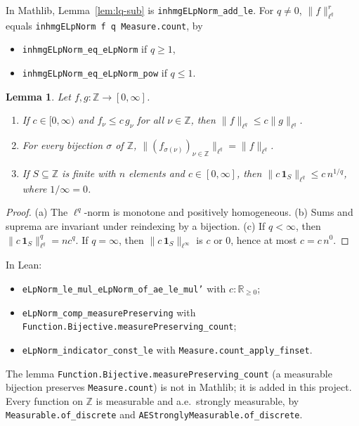 \documentclass[11pt]{article}
\newtheorem{lemma}[theorem]{Lemma}
\theoremstyle{definition}
\theoremstyle{remark}
\newcommand{\norm}[2]{\lVert #1\rVert_{#2}}
\newcommand{\Z}{\mathbb Z}
\newcommand{\one}{\mathbf 1}
\begin{document}
In Mathlib, Lemma~\ref{lem:lq-sub} is \texttt{inhmgELpNorm\_add\_le}. For \(q \ne 0\),
\(\norm{f}{\ell^q}^r\) equals \texttt{inhmgELpNorm f q Measure.count}, by
\begin{itemize}
  \item \texttt{inhmgELpNorm\_eq\_eLpNorm} if \(q \ge 1\),
  \item \texttt{inhmgELpNorm\_eq\_eLpNorm\_pow} if \(q \le 1\).
\end{itemize}

\begin{lemma}\label{lem:lq-facts}
  Let \(f, g \colon \Z \to [0,\infty]\).
  \begin{enumerate}
    \item[(a)] If \(c \in [0,\infty)\) and \(f_\nu \le c\, g_\nu\) for all \(\nu \in \Z\), then
      \(\norm{f}{\ell^q} \le c \norm{g}{\ell^q}\).
    \item[(b)] For every bijection \(\sigma\) of \(\Z\),
      \(\norm{(f_{\sigma(\nu)})_{\nu \in \Z}}{\ell^q} = \norm{f}{\ell^q}\).
    \item[(c)] If \(S \subseteq \Z\) is finite with \(n\) elements and \(c \in [0,\infty]\), then
      \(\norm{c\, \one_S}{\ell^q} \le c\, n^{1/q}\), where \(1/\infty = 0\).
  \end{enumerate}
\end{lemma}

\begin{proof}
  (a) The \(\ell^q\)-norm is monotone and positively homogeneous. (b) Sums and suprema are
  invariant under reindexing by a bijection. (c) If \(q < \infty\), then \(\norm{c\,\one_S}{\ell^q}^q = n c^q\). If
  \(q = \infty\), then \(\norm{c\,\one_S}{\ell^\infty}\) is \(c\) or \(0\), hence at most
  \(c = c\, n^0\).
\end{proof}

In Lean:
\begin{itemize}
  \item[(a)] \texttt{eLpNorm\_le\_mul\_eLpNorm\_of\_ae\_le\_mul'} with \(c : \mathbb R_{\ge 0}\);
  \item[(b)] \texttt{eLpNorm\_comp\_measurePreserving} with\\
    \texttt{Function.Bijective.measurePreserving\_count};
  \item[(c)] \texttt{eLpNorm\_indicator\_const\_le} with \texttt{Measure.count\_apply\_finset}.
\end{itemize}
The lemma \texttt{Function.Bijective.measurePreserving\_count} (a measurable bijection
preserves \texttt{Measure.count}) is not in Mathlib; it is added in this project.
Every function on \(\Z\) is measurable and a.e.\ strongly measurable, by
\texttt{Measurable.of\_discrete} and \texttt{AEStronglyMeasurable.of\_discrete}.
\end{document}
